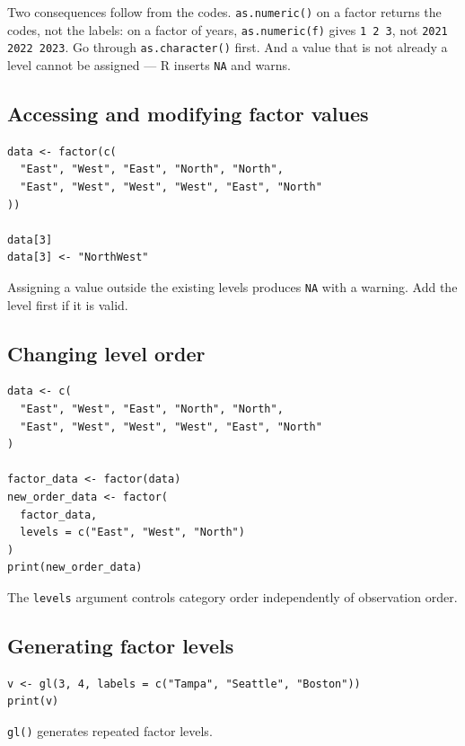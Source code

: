 \begin{pitfall}
Two consequences follow from the codes. \texttt{as.numeric()} on a factor
returns the codes, not the labels: on a factor of years,
\texttt{as.numeric(f)} gives \texttt{1 2 3}, not \texttt{2021 2022 2023}. Go
through \texttt{as.character()} first. And a value that is not already a level
cannot be assigned --- R inserts \texttt{NA} and warns.
\end{pitfall}

\subsection{Accessing and modifying factor values}

\begin{lstlisting}[style=dsr]
data <- factor(c(
  "East", "West", "East", "North", "North",
  "East", "West", "West", "West", "East", "North"
))

data[3]
data[3] <- "NorthWest"
\end{lstlisting}

Assigning a value outside the existing levels produces \texttt{NA} with a warning. Add the level first if it is valid.

\subsection{Changing level order}

\begin{lstlisting}[style=dsr]
data <- c(
  "East", "West", "East", "North", "North",
  "East", "West", "West", "West", "East", "North"
)

factor_data <- factor(data)
new_order_data <- factor(
  factor_data,
  levels = c("East", "West", "North")
)
print(new_order_data)
\end{lstlisting}

The \texttt{levels} argument controls category order independently of observation order.

\subsection{Generating factor levels}

\begin{lstlisting}[style=dsr]
v <- gl(3, 4, labels = c("Tampa", "Seattle", "Boston"))
print(v)
\end{lstlisting}

\texttt{gl()} generates repeated factor levels.

